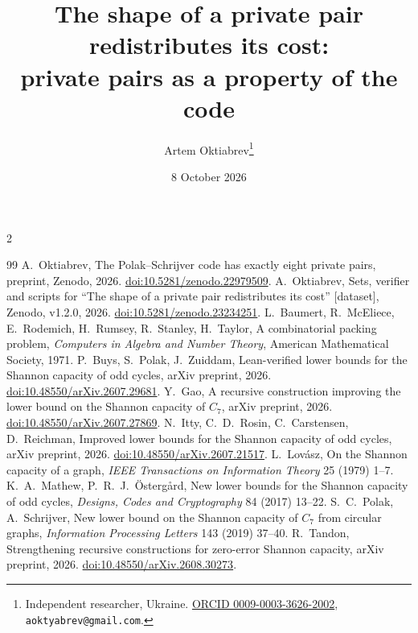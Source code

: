 \documentclass[11pt]{article}
\title{The shape of a private pair redistributes its cost:\\ private pairs as a property of the code}
\author{Artem Oktiabrev\thanks{Independent researcher, Ukraine.
\href{https://orcid.org/0009-0003-3626-2002}{ORCID 0009-0003-3626-2002},
\texttt{aoktyabrev@gmail.com}.}}
\date{8 October 2026}
\theoremstyle{definition}
\theoremstyle{remark}
\begin{document}
\maketitle

\begin{abstract}

\end{abstract}



\footnotesize
\begin{multicols}{2}
\begin{thebibliography}{99}
\setlength{\itemsep}{-1pt}
\setlength{\parsep}{0pt}
 A.~Oktiabrev, The Polak--Schrijver code has exactly eight private
pairs, preprint, Zenodo, 2026.
\href{https://doi.org/10.5281/zenodo.22979509}{doi:10.5281/zenodo.22979509}.
 A.~Oktiabrev, Sets, verifier and scripts for ``The shape of a private
pair redistributes its cost'' [dataset], Zenodo, v1.2.0, 2026.
\href{https://doi.org/10.5281/zenodo.23234251}{doi:10.5281/zenodo.23234251}.
 L.~Baumert, R.~McEliece, E.~Rodemich, H.~Rumsey, R.~Stanley, H.~Taylor,
A combinatorial packing problem, \textit{Computers in Algebra and Number Theory}, American
Mathematical Society, 1971.
 P.~Buys, S.~Polak, J.~Zuiddam, Lean-verified lower bounds for the Shannon
capacity of odd cycles, arXiv preprint, 2026. \href{https://doi.org/10.48550/arXiv.2607.29681}{doi:10.48550/arXiv.2607.29681}.
 Y.~Gao, A recursive construction improving the lower bound on the Shannon
capacity of $C_7$, arXiv preprint, 2026. \href{https://doi.org/10.48550/arXiv.2607.27869}{doi:10.48550/arXiv.2607.27869}.
 N.~Itty, C.~D.~Rosin, C.~Carstensen, D.~Reichman, Improved lower bounds
for the Shannon capacity of odd cycles, arXiv preprint, 2026. \href{https://doi.org/10.48550/arXiv.2607.21517}{doi:10.48550/arXiv.2607.21517}.
 L.~Lov\'asz, On the Shannon capacity of a graph, \textit{IEEE
Transactions on Information Theory} 25 (1979) 1--7.
 K.~A.~Mathew, P.~R.~J.~\"Osterg{\aa}rd, New lower bounds for the Shannon
capacity of odd cycles, \textit{Designs, Codes and Cryptography} 84 (2017) 13--22.
 S.~C.~Polak, A.~Schrijver, New lower bound on the Shannon capacity of
$C_7$ from circular graphs, \textit{Information Processing Letters} 143 (2019) 37--40.
 R.~Tandon, Strengthening recursive constructions for zero-error Shannon
capacity, arXiv preprint, 2026. \href{https://doi.org/10.48550/arXiv.2608.30273}{doi:10.48550/arXiv.2608.30273}.
\end{thebibliography}
\end{multicols}
\end{document}

